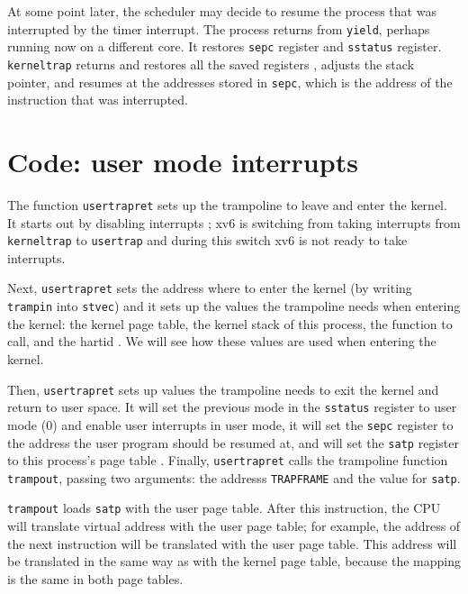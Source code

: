 At some point later, the scheduler may decide to resume the process
that was interrupted by the timer interrupt. The process returns from
\lstinline{yield}, perhaps running now on a different core.  It
restores \lstinline{sepc} register and \lstinline{sstatus} register.
\lstinline{kerneltrap} returns and restores all the saved registers
, adjusts the stack
pointer, and resumes at the addresses stored in \lstinline{sepc},
which is the address of the instruction that was interrupted.

\section{Code: user mode interrupts}

The function \lstinline{usertrapret}
 sets up the trampoline to leave
and enter the kernel.  It starts out by disabling interrupts
; xv6 is switching from taking
interrupts from \lstinline{kerneltrap} to \lstinline{usertrap} and
during this switch xv6 is not ready to take interrupts.

Next, \lstinline{usertrapret} sets the address where to enter the
kernel (by writing \lstinline{trampin} into \lstinline{stvec}) and it
sets up the values the trampoline needs when entering the kernel: the
kernel page table, the kernel stack of this process, the function to
call, and the hartid
.  We will see
how these values are used when entering the kernel.

Then, \lstinline{usertrapret} sets up values the trampoline needs to
exit the kernel and return to user space.  It will set the
previous mode in the \lstinline{sstatus} register to user mode (0) and
enable user interrupts in user mode, it will set the \lstinline{sepc}
register to the address the user program should be resumed at, and
will set the \lstinline{satp} register to this process's page table
.
Finally, \lstinline{usertrapret} calls
the trampoline function \lstinline{trampout}, passing two arguments: the addresss
\lstinline{TRAPFRAME} and the value for \lstinline{satp}.

\lstinline{trampout}  loads
\lstinline{satp} with the user page table.  After this instruction,
the CPU will translate virtual address with the user page table;
for example, the address of the next instruction will be translated
with the user page table.  This address will be translated in the same
way as with the kernel page table, because the mapping is the same in
both page tables.

